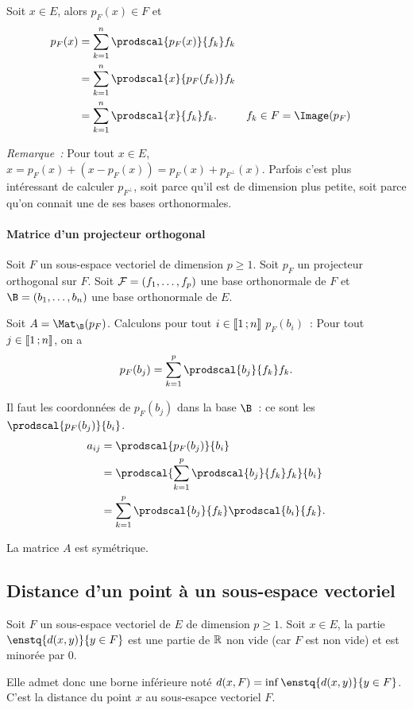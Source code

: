 Soit $x \in E$, alors $p_F(x) \in F$ et
\begin{align}
  p_F(x) &=\sum_{k=1}^n \prodscal{p_F(x)}{f_k}f_k \\
  &=\sum_{k=1}^n \prodscal{x}{p_F(f_k)}f_k \\
  &=\sum_{k=1}^n \prodscal{x}{f_k}f_k. && f_k \in F=\Image(p_F)
\end{align}

\emph{Remarque~:} Pour tout $x \in E$, $x = p_F(x) +(x-p_F(x)) = p_F(x) + p_{F^\perp}(x)$. Parfois c'est plus intéressant de calculer $p_{F^\perp}$, soit parce qu'il est de dimension plus petite, soit parce qu'on connait une de ses bases orthonormales.

\paragraph{Matrice d'un projecteur orthogonal}
Soit $F$ un sous-espace vectoriel de dimension $p \geq 1$. Soit $p_F$ un projecteur orthogonal sur $F$. Soit $\mathcal{F}=(f_1, \ldots, f_p)$ une base orthonormale de $F$ et $\B=(b_1, \ldots, b_n)$ une base orthonormale de $E$.

Soit $A=\Mat_\B(p_F)$. Calculons pour tout $i \in \mathopen{\llbracket}1\mathclose{}\mathpunct{};n\mathclose{\rrbracket}$ $p_F(b_i)$~: Pour tout $j \in \mathopen{\llbracket}1\mathclose{}\mathpunct{};n\mathclose{\rrbracket}$, on a
\begin{equation}
  p_F(b_j)=\sum_{k=1}^p \prodscal{b_j}{f_k}f_k.
\end{equation}

Il faut les coordonnées de $p_F(b_j)$ dans la base $\B$~: ce sont les $\prodscal{p_F(b_j)}{b_i}$.
\begin{align}
  a_{ij} &= \prodscal{p_F(b_j)}{b_i} \\
  &= \prodscal{\sum_{k=1}^p \prodscal{b_j}{f_k}f_k}{b_i} \\
  &= \sum_{k=1}^p \prodscal{b_j}{f_k} \prodscal{b_i}{f_k}.
\end{align}

La matrice $A$ est symétrique.

\subsection{Distance d'un point à un sous-espace vectoriel}

Soit $F$ un sous-espace vectoriel de $E$ de dimension $p \geq 1$. Soit $x \in E$, la partie $\enstq{d(x,y)}{y \in F}$ est une partie de $\mathbb{R}$ non vide (car $F$ est non vide) et est minorée par $0$.

Elle admet donc une borne inférieure noté $d(x,F)=\inf\enstq{d(x,y)}{y \in F}$. C'est la distance du point $x$ au sous-esapce vectoriel $F$.


